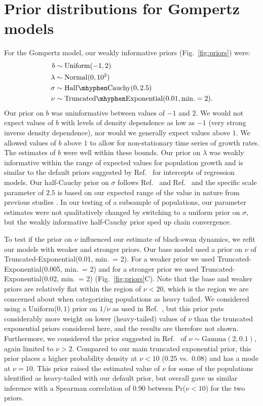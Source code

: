 \documentclass[12pt]{article}
\begin{document}
\section{Prior distributions for Gompertz models}

For the Gompertz model, our weakly informative priors (Fig.~\ref{fig:priors}) were:
\begin{align}
b &\sim \mathrm{Uniform}(-1, 2)\\
\lambda &\sim \mathrm{Normal}(0, 10^2)\\
\sigma &\sim \mathrm{Half\mhyphen Cauchy} (0, 2.5)\\
\nu &\sim \mathrm{Truncated\mhyphen Exponential}(0.01, \mathrm{min.} = 2).
\end{align}
Our prior on \(b\) was uninformative between values of \(-1\) and \(2\). We
would not expect values of \(b\) with levels of density dependence as low as
\(-1\) (very strong inverse density dependence), nor would we generally expect
values above \(1\). We allowed values of \(b\) above \(1\) to allow for
non-stationary time series of growth rates. The estimates of \(b\) were well
within these bounds. Our prior on \(\lambda\) was weakly informative within the
range of expected values for population growth and is similar to the default
priors suggested by Ref.~\cite{gelman2008d} for intercepts of
regression models. Our half-Cauchy prior on \(\sigma\) follows
Ref.~\cite{gelman2006c} and Ref.~\cite{gelman2008d} and the specific scale parameter of
\(2.5\) is based on our expected range of the value in nature from previous
studies \cite{connors2014}. In our testing of a subsample of populations, our
parameter estimates were not qualitatively changed by switching to a uniform
prior on \(\sigma\), but the weakly informative half-Cauchy prior sped up chain
convergence.

To test if the prior on \(\nu\) influenced our estimate of black-swan dynamics,
we refit our models with weaker and stronger priors. Our base model used a
prior on \(\nu\) of Truncated-Exponential(0.01, min.\ = 2). For a weaker prior
we used Truncated-Exponential(0.005, min.\ = 2) and for a stronger prior we
used Truncated-Exponential(0.02, min.\ = 2) (Fig.~\ref{fig:priors}C). Note that
the base and weaker priors are relatively flat within the region of \(\nu <
20\), which is the region we are concerned about when categorizing
populations as heavy tailed. We considered using a Uniform(\(0, 1\))
prior on \(1/\nu\) as used in Ref.~\cite{gelman2014}, but this
prior puts considerably more weight on lower (heavy-tailed) values of \(\nu\)
than the truncated exponential priors considered here,
and the results are therefore not shown.
Furthermore, we considered the prior suggested in Ref.~\cite{juarez2010} of
$\nu \sim \mathrm{Gamma}(2, 0.1)$, again limited to $\nu > 2$.
Compared to our main truncated exponential prior,
this prior places a higher probability density at $\nu < 10$ ($0.25$ vs.\ $0.08$)
and has a mode at $\nu = 10$.
This prior raised the estimated value of $\nu$
for some of the populations identified as heavy-tailed
with our default prior,
but overall gave us similar inference
with a Spearman correlation of 0.90 between Pr($\nu < 10$)
for the two priors.
\end{document}
